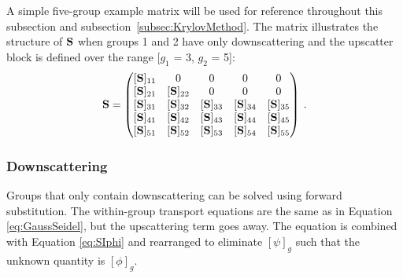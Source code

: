 A simple five-group example matrix will be used for reference throughout this subsection and subsection~\ref{subsec:KrylovMethod}. The matrix illustrates the structure of $\mathbf{S}$  when groups 1 and 2 have only downscattering and the upscatter block is defined over the range [$g_{1}$ = 3, $g_{2}$ = 5]:
%
\begin{equation}
  \mathbf{S}  =     \begin{pmatrix}
      [\ve{S}]_{11} &0 & 0 & 0 & 0 \\
      [\ve{S}]_{21} & [\ve{S}]_{22} & 0 & 0 & 0 \\
      [\ve{S}]_{31} & [\ve{S}]_{32} & [\ve{S}]_{33} & [\ve{S}]_{34} & [\ve{S}]_{35} \\
      [\ve{S}]_{41} & [\ve{S}]_{42} & [\ve{S}]_{43} & [\ve{S}]_{44} & [\ve{S}]_{45} \\
      [\ve{S}]_{51} & [\ve{S}]_{52} & [\ve{S}]_{53} & [\ve{S}]_{54} & [\ve{S}]_{55}
    \end{pmatrix} \:.
    \label{eq:exmp-matrix}
\end{equation}

\subsubsection{Downscattering}
Groups that only contain downscattering can be solved using forward substitution. The within-group transport equations are the same as in Equation \eqref{eq:GaussSeidel}, but the upscattering term goes away. The equation is combined with Equation \eqref{eq:SIphi} and rearranged to eliminate $[\psi]_{g}$ such that the unknown quantity is $[\phi]_{g}$. 

